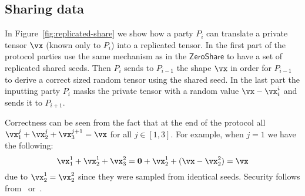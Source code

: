 \subsection{Sharing data}

In Figure~\ref{fig:replicated-share} we show how a party $P_i$ can translate a private tensor $\vx$ (known only to $P_i$) into a replicated tensor. In the first part of the protocol parties use the same mechanism as in the $\mathsf{ZeroShare}$ to have a set of replicated shared seeds. Then $P_i$ sends to $P_{i-1}$ the shape $\vx$ in order for $P_{i-1}$ to derive a correct sized random tensor using the shared seed. In the last part the inputting party $P_i$ masks the private tensor with a random value $\vx - \vx_i^i$ and sends it to $P_{i+1}$.

Correctness can be seen from the fact that at the end of the protocol all $\vx_1^j + \vx_2^j + \vx_3^{j+1} = \vx$ for all $j \in [1,3]$. For example, when $j = 1$ we have the following:
$$\vx_1^1 + \vx_2^1 + \vx_3^2 = \mathbf{0} + \vx_2^1 + (\vx - \vx_2^2) = \vx $$ due to $\vx_2^1 = \vx_2^2$ since they were sampled from identical seeds. Security follows from~\cite{CCS:ABFLNO16} or~\cite{CCS:MohRin18}.


